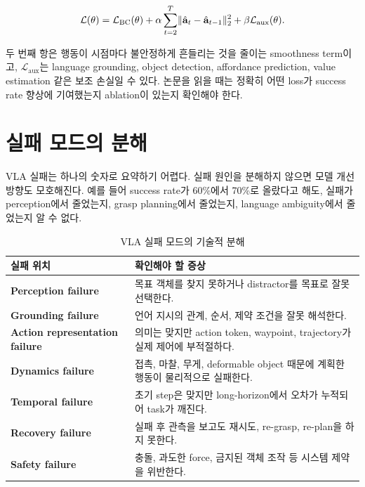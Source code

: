 \begin{equation}
  \mathcal{L}(\theta)
  =
  \mathcal{L}_{\mathrm{BC}}(\theta)
  +
  \alpha \sum_{t=2}^{T}
  \lVert \hat{\mathbf{a}}_{t} - \hat{\mathbf{a}}_{t-1} \rVert_2^2
  +
  \beta \mathcal{L}_{\mathrm{aux}}(\theta).
  \label{eq:vla_loss}
\end{equation}

두 번째 항은 행동이 시점마다 불안정하게 흔들리는 것을 줄이는 smoothness term이고, $\mathcal{L}_{\mathrm{aux}}$는 language grounding, object detection, affordance prediction, value estimation 같은 보조 손실일 수 있다. 논문을 읽을 때는 정확히 어떤 loss가 success rate 향상에 기여했는지 ablation이 있는지 확인해야 한다.

\section{실패 모드의 분해}

VLA 실패는 하나의 숫자로 요약하기 어렵다. 실패 원인을 분해하지 않으면 모델 개선 방향도 모호해진다. 예를 들어 success rate가 60\%에서 70\%로 올랐다고 해도, 실패가 perception에서 줄었는지, grasp planning에서 줄었는지, language ambiguity에서 줄었는지 알 수 없다.

\begin{table}[t]
  \centering
  \caption{VLA 실패 모드의 기술적 분해}
  \label{tab:failure_modes}
  \begin{tabularx}{\textwidth}{>{\bfseries}p{32mm}X}
    \toprule
    실패 위치 & 확인해야 할 증상 \\
    \midrule
    Perception failure & 목표 객체를 찾지 못하거나 distractor를 목표로 잘못 선택한다. \\
    Grounding failure & 언어 지시의 관계, 순서, 제약 조건을 잘못 해석한다. \\
    Action representation failure & 의미는 맞지만 action token, waypoint, trajectory가 실제 제어에 부적절하다. \\
    Dynamics failure & 접촉, 마찰, 무게, deformable object 때문에 계획한 행동이 물리적으로 실패한다. \\
    Temporal failure & 초기 step은 맞지만 long-horizon에서 오차가 누적되어 task가 깨진다. \\
    Recovery failure & 실패 후 관측을 보고도 재시도, re-grasp, re-plan을 하지 못한다. \\
    Safety failure & 충돌, 과도한 force, 금지된 객체 조작 등 시스템 제약을 위반한다. \\
    \bottomrule
  \end{tabularx}
\end{table}

